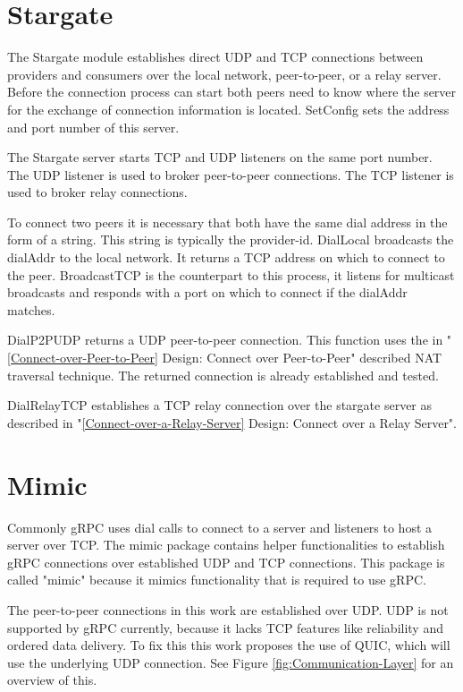 \section{Stargate}
The Stargate module establishes direct UDP and TCP connections between providers and consumers over the local network, peer-to-peer, or a relay server. Before the connection process can start both peers need to know where the server for the exchange of connection information is located. SetConfig sets the address and port number of this server.

The Stargate server starts TCP and UDP listeners on the same port number. The UDP listener is used to broker peer-to-peer connections. The TCP listener is used to broker relay connections.

To connect two peers it is necessary that both have the same dial address in the form of a string. This string is typically the provider-id. DialLocal broadcasts the dialAddr to the local network. It returns a TCP address on which to connect to the peer. BroadcastTCP is the counterpart to this process, it listens for multicast broadcasts and responds with a port on which to connect if the dialAddr matches.

DialP2PUDP returns a UDP peer-to-peer connection. This function uses the in "\ref{Connect-over-Peer-to-Peer} Design: Connect over Peer-to-Peer" described NAT traversal technique. The returned connection is already established and tested.

DialRelayTCP establishes a TCP relay connection over the stargate server as described in "\ref{Connect-over-a-Relay-Server} Design: Connect over a Relay Server".

\section{Mimic}
Commonly gRPC uses dial calls to connect to a server and listeners to host a server over TCP. The mimic package contains helper functionalities to establish gRPC connections over established UDP and TCP connections. This package is called "mimic" because it mimics functionality that is required to use gRPC.

The peer-to-peer connections in this work are established over UDP. UDP is not supported by gRPC currently, because it lacks TCP features like reliability and ordered data delivery. To fix this this work proposes the use of QUIC, which will use the underlying UDP connection. See Figure \ref{fig:Communication-Layer} for an overview of this.


